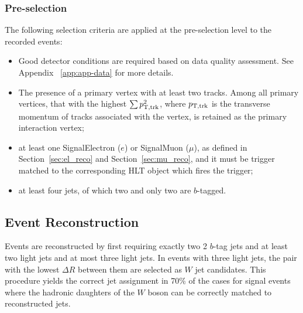 \subsubsection{Pre-selection}
The following selection criteria are applied at the pre-selection level to the recorded events:
\begin{itemize}
\item Good detector conditions are required based on data quality assessment. See Appendix ~\ref{app:app-data} for more details.

\item The presence of a  primary vertex with at least two
  tracks. Among all primary vertices, that with the highest
	$\sum p_{{\rm T,trk}}^{2}$, where
	$p_{{\rm T,trk}}$ is the transverse momentum of tracks
	associated with the vertex, is retained as the primary
  interaction vertex;
\item at least one SignalElectron ($e$) or SignalMuon ($\mu$), as defined in Section~\ref{sec:el_reco} and Section~\ref{sec:mu_reco}, and it must be trigger matched to the 
corresponding HLT object which fires the trigger;
\item at least four jets, of which two and only two are $b$-tagged.
\end{itemize}

\subsection{Event Reconstruction}
\label{ssec:event_reco_res} 
Events are reconstructed by first requiring exactly two 2 $b$-tag jets and at least two light
jets and at most three light jets. In events with three light jets, the pair with the 
lowest $\Delta R$ between them are selected as $W$ jet candidates. This
procedure yields the correct jet assignment in 70\% of the cases for
signal events where the
hadronic daughters of the $W$ boson can be correctly matched to reconstructed
jets. %

